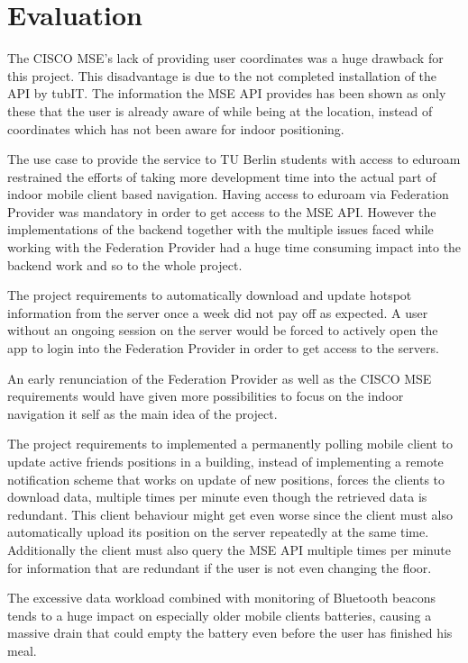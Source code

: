 \chapter{Evaluation}
\label{cha:evaluation}


The CISCO MSE's lack of providing user coordinates was a huge drawback for this project. This disadvantage is due to the not completed installation of the API by tubIT. The information the MSE API provides has been shown as only these that the user is already aware of while being at the location, instead of coordinates which has not been aware for indoor positioning.

The use case to provide the service to TU Berlin students with access to eduroam restrained the efforts of taking more development time into the actual part of indoor mobile client based navigation. Having access to eduroam via Federation Provider was mandatory in order to get access to the MSE API. However the implementations of the backend together with the multiple issues faced while working with the Federation Provider had a huge time consuming impact into the backend work and so to the whole project. 

The project requirements to automatically download and update hotspot information from the server once a week did not pay off as expected. A user without an ongoing session on the server would be forced to actively open the app to login into the Federation Provider in order to get access to the servers. 

An early renunciation of the Federation Provider as well as the CISCO MSE requirements would have given more possibilities to focus on the indoor navigation it self as the main idea of the project.

The project requirements to implemented a permanently polling mobile client to update 
active friends positions in a building, instead of implementing a remote notification scheme that works on update of new positions, forces the clients to download data, multiple times per minute even though the retrieved data is redundant. This client behaviour might get even worse since the client must also automatically upload its position on the server repeatedly at the same time. Additionally the client must also query the MSE API multiple times per minute for information that are redundant if the user is not even changing the floor.
  
The excessive data workload combined with monitoring of Bluetooth beacons tends to a huge impact on especially older mobile clients batteries, causing a massive drain that could empty the battery even before the user has finished his meal.

